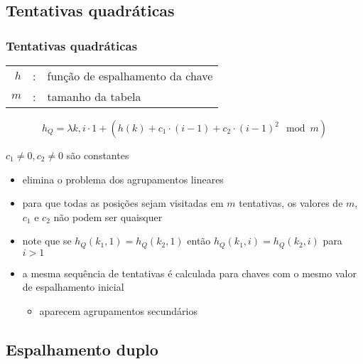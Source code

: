 \documentclass{beamer}
\begin{document}
\subsection{Tentativas quadráticas}

\begin{frame}

\frametitle{Tentativas quadráticas}

\begin{tabular}{rcl}
$h$ & : & função de espalhamento da chave \\
$m$ & : & tamanho da tabela
\end{tabular}

$$h_Q = \lambda k, i \cdot 1 + (h(k) + c_1 \cdot (i-1) + c_2 \cdot(i-1)^2 \mod m)$$

$c_1 \neq 0, c_2 \neq 0$ são constantes

\begin{itemize}
\item elimina o problema dos agrupamentos lineares
\item para que todas as posições sejam visitadas em $m$ tentativas, os valores
  de $m$, $c_1$ e $c_2$ não podem ser quaisquer
\item note que se $h_Q(k_1, 1) = h_Q(k_2, 1)$ então $h_Q(k_1, i) = h_Q(k_2, i)$ para $i > 1$
\item a mesma sequência de tentativas é calculada para chaves com o mesmo valor de espalhamento inicial
\begin{itemize}
\item aparecem \alert{agrupamentos secundários}
\end{itemize}
\end{itemize}

\end{frame}

\subsection{Espalhamento duplo}
\end{document}
